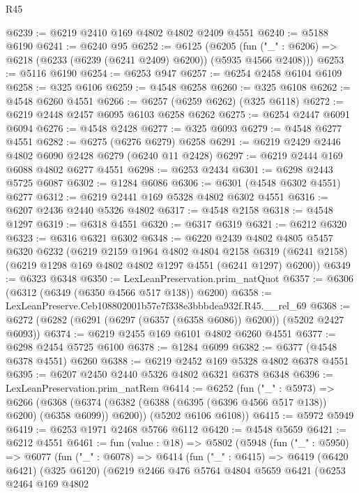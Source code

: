 \begin{lexlean}{R45}
\begin{coremodule}
@6239 := @6219 @2410 @169 @4802 @4802 @2409 @4551
@6240 := @5188 @6190
@6241 := @6240 @95
@6252 := @6125
    (@6205 (fun ("_" : @6206) => @6218 (@6233 (@6239 (@6241 @2409) @6200)) (@5935 @4566 @2408)))
@6253 := @5116 @6190
@6254 := @6253 @947
@6257 := @6254 @2458 @6104 @6109
@6258 := @325 @6106
@6259 := @4548 @6258
@6260 := @325 @6108
@6262 := @4548 @6260 @4551
@6266 := @6257 (@6259 @6262) (@325 @6118)
@6272 := @6219 @2448 @2457 @6095 @6103 @6258 @6262
@6275 := @6254 @2447 @6091 @6094
@6276 := @4548 @2428
@6277 := @325 @6093
@6279 := @4548 @6277 @4551
@6282 := @6275 (@6276 @6279) @6258
@6291 := @6219 @2429 @2446 @4802 @6090 @2428 @6279 (@6240 @11 @2428)
@6297 := @6219 @2444 @169 @6088 @4802 @6277 @4551
@6298 := @6253 @2434
@6301 := @6298 @2443 @5725 @6087
@6302 := @1284 @6086
@6306 := @6301 (@4548 @6302 @4551) @6277
@6312 := @6219 @2441 @169 @5328 @4802 @6302 @4551
@6316 := @6207 @2436 @2440 @5326 @4802
@6317 := @4548 @2158
@6318 := @4548 @1297
@6319 := @6318 @4551
@6320 := @6317 @6319
@6321 := @6212 @6320
@6323 := @6316 @6321 @6302
@6348 := @6220
    @2439
    @4802
    @4805
    @5457
    @6320
    @6232
    (@6219
      @2159
      @1964
      @4802
      @4804
      @2158
      @6319
      (@6241 @2158)
      (@6219 @1298 @169 @4802 @4802 @1297 @4551 (@6241 @1297) @6200))
@6349 := @6323 @6348
@6350 := LexLeanPreservation.prim_natQuot
@6357 := @6306 (@6312 (@6349 (@6350 @4566 @517 @138)) @6200)
@6358 := LexLeanPreserve.Ceb108802001b57e7f338e3bbbdea932f.R45.__rel_69
@6368 := @6272 (@6282 (@6291 (@6297 (@6357 (@6358 @6086)) @6200)) (@5202 @2427 @6093))
@6374 := @6219 @2455 @169 @6101 @4802 @6260 @4551
@6377 := @6298 @2454 @5725 @6100
@6378 := @1284 @6099
@6382 := @6377 (@4548 @6378 @4551) @6260
@6388 := @6219 @2452 @169 @5328 @4802 @6378 @4551
@6395 := @6207 @2450 @2440 @5326 @4802 @6321 @6378 @6348
@6396 := LexLeanPreservation.prim_natRem
@6414 := @6252
    (fun ("_" : @5973) =>
    @6266
      (@6368 (@6374 (@6382 (@6388 (@6395 (@6396 @4566 @517 @138)) @6200) (@6358 @6099)) @6200))
      (@5202 @6106 @6108))
@6415 := @5972 @5949
@6419 := @6253 @1971 @2468 @5766 @6112
@6420 := @4548 @5659
@6421 := @6212 @4551
@6461 := fun (value : @18) =>
  @5802
    (@5948
      (fun ("_" : @5950) =>
      @6077
        (fun ("_" : @6078) =>
        @6414
          (fun ("_" : @6415) =>
          @6419
            (@6420 @6421)
            (@325 @6120)
            (@6219
              @2466
              @476
              @5764
              @4804
              @5659
              @6421
              (@6253
                @2464
                @169
                @4802

\end{coremodule}
\end{lexlean}
